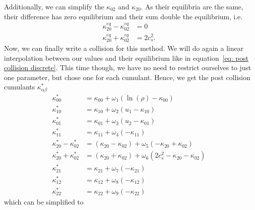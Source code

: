Additionally, we can simplify the $\kappa_{02}$ and $\kappa_{20}$.
As their equilibria are the same, their difference has zero equilibrium and their sum double the equilibrium, i.e.
\begin{equation}
  \begin{aligned}
    \kappa_{20}^{eq} - \kappa_{02}^{eq} & = 0  \\
    \kappa_{20}^{eq} + \kappa_{02}^{eq} & = 2 c_s^2.
  \end{aligned}
\end{equation}
%
Now, we can finally write a collision for this method.
We will do again a linear interpolation between our values and their equilibrium like in equation~\eqref{eq: post collision discrete}.
This time though, we have no need to restrict ourselves to just one parameter, but chose one for each cumulant.
Hence, we get the post collision cumulants $\kappa_{\alpha\beta}^*$
\begin{equation}
  \label{eq: post equilibrium cumulants}
  \begin{aligned}
    \kappa_{00}^{*} & = \kappa_{00} + \omega_1 \left( \ln(\rho) - \kappa_{00} \right) \\
    \kappa_{10}^{*} & = \kappa_{10} + \omega_2 \left( u_1 - \kappa_{10} \right) \\
    \kappa_{01}^{*} & = \kappa_{01} + \omega_3 \left( u_2 - \kappa_{01} \right) \\
    \kappa_{11}^{*} & = \kappa_{11} + \omega_4 \left( - \kappa_{11} \right) \\
    \kappa_{20}^{*} - \kappa_{02}^{*}
      & = (\kappa_{20} - \kappa_{02}) + \omega_5 \left( - \kappa_{20} + \kappa_{02} \right) \\
    \kappa_{20}^{*} + \kappa_{02}^{*}
      & = (\kappa_{20} + \kappa_{02}) + \omega_6 \left( 2 c_s^2 - \kappa_{20} - \kappa_{02} \right) \\
    \kappa_{21}^{*} & = \kappa_{21} + \omega_7 \left( - \kappa_{21} \right) \\
    \kappa_{12}^{*} & = \kappa_{12} + \omega_8 \left( - \kappa_{12} \right) \\
    \kappa_{22}^{*} & = \kappa_{22} + \omega_9 \left( - \kappa_{22} \right)
  \end{aligned}
\end{equation}
which can be simplified to

